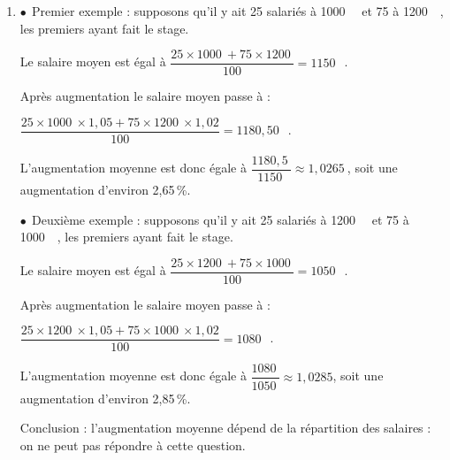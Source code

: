 \documentclass[10pt]{article}
\providecommand{\euro}{\texteuro}
\providecommand{\np}[2][]{{#2~#1}}
\providecommand{\euro}{{\text{€}}}
\renewcommand{\euro}{\ifmmode\text{\texteuro}\else\texteuro\fi}
\begin{document}
\begin{enumerate}
\begin{enumerate}
Soit $p(X\leqslant5)$. À la calculatrice, $p(X\leqslant5)\approx 0,617$.\\ Cela signifie que la probabilité qu'au plus 5 salariés aient effectué le stage, est égale à 0,617.
	 
	 La probabilité qu'au moins 6 salariés suivent le stage est d'environ 0,617.
	\item $p(X\geqslant 6)=1-p(X<6)=1-p(X\leqslant5)\approx 1-0,617\approx0,383$
\end{enumerate}
\item 



$\bullet~~$Premier exemple : supposons qu'il y ait 25 salariés à \np{1000}~\euro{} et 75 à \np{1200}~\euro{}, les premiers ayant fait le stage.

Le salaire moyen est égal à $\dfrac{25 \times \np{1000} + 75 \times \np{1200}}{100} = \np{1150}$~\euro.

Après augmentation le salaire moyen passe à :

$\dfrac{25 \times \np{1000} \times 1,05 + 75 \times\np{1200}\times 1,02}{100} = \np{1180,50}$~\euro.

L'augmentation moyenne est donc égale à $\dfrac{\np{1180,5}}{\np{1150}}\approx \np{1,0265}$, soit une augmentation d'environ 2,65\,\%.

$\bullet~~$Deuxième exemple : supposons qu'il y ait 25 salariés à \np{1200}~\euro{} et 75 à \np{1000}~\euro{}, les premiers ayant fait le stage.

Le salaire moyen est égal à $\dfrac{25 \times \np{1200} + 75 \times \np{1000}}{100} = \np{1050}$~\euro.

Après augmentation le salaire moyen passe à :

$\dfrac{25 \times \np{1200} \times 1,05 + 75 \times\np{1000}\times 1,02}{100} = \np{1080}$~\euro.

L'augmentation moyenne est donc égale à $\dfrac{\np{1080}}{\np{1050}}\approx 1,0285$, soit une augmentation d'environ 2,85\,\%.

Conclusion : l'augmentation moyenne dépend de la répartition des salaires : on ne peut pas répondre à cette question.
\end{enumerate}

\bigskip
\end{document}
